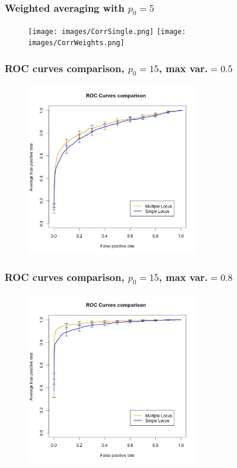 \documentclass{beamer}
\begin{document}
\begin{frame}
\frametitle{Weighted averaging with $p_0 = 5$}
\begin{figure}
\texttt{[image: images/CorrSingle.png]}
\texttt{[image: images/CorrWeights.png]}
\end{figure}
\end{frame}


\begin{frame}
\frametitle{ROC curves comparison, $p_0 = 15$, max var.$=0.5$}
\begin{figure}
\includegraphics[width=3in]{images/ROC_Comp_p0_15_var_0_5.jpeg}
\end{figure}
\end{frame}
\begin{frame}
\frametitle{ROC curves comparison, $p_0 = 15$, max var.$=0.8$}
\begin{figure}
\includegraphics[width=3in]{images/ROC_Comp_p0_15_var_0_8.jpeg}
\end{figure}
\end{frame}
\end{document}
